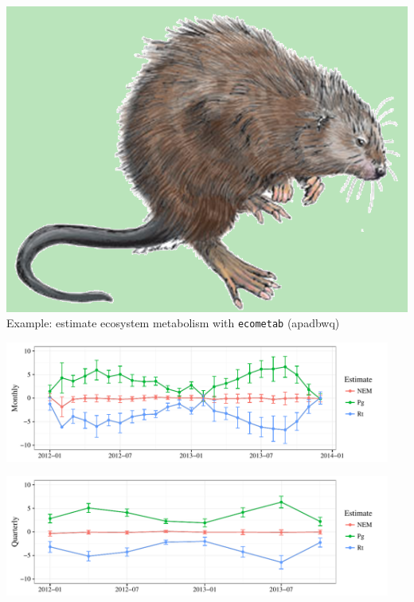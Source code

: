 \documentclass[serif]{beamer}\usepackage[]{graphicx}\usepackage[]{color}
\newenvironment{knitrout}{}{} %
\begin{document}
\begin{frame}[fragile]{\includegraphics[width=0.05\paperwidth]{fig/muskrat.png}\hspace{0.07in}{\bf SWMPrats.net: The SWMPr package}}
Example: estimate ecosystem metabolism with \texttt{ecometab} (apadbwq)

\begin{knitrout}
\color{fgcolor}

{\centering \includegraphics[width=0.95\textwidth]{fig//ecometab1-1} 

}



\end{knitrout}
\begin{knitrout}
\color{fgcolor}

{\centering \includegraphics[width=0.95\textwidth]{fig//ecometab2-1} 

}



\end{knitrout}
\end{frame}
\end{document}
